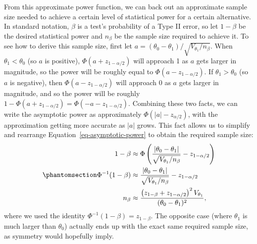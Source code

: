 \documentclass[
  13pt,
  letterpaper,
  DIV=11,
  numbers=noendperiod]{scrreprt}
\theoremstyle{plain}
\theoremstyle{plain}
\theoremstyle{definition}
\theoremstyle{definition}
\theoremstyle{remark}
\begin{document}
From this approximate power function, we can back out an approximate
sample size needed to achieve a certain level of statistical power for a
certain alternative. In standard notation, \(\beta\) is a test's
probability of a Type II error, so let \(1-\beta\) be the desired
statistical power and \(n_{\beta}\) be the sample size required to
achieve it. To see how to derive this sample size, first let
\(a=(\theta_0 - \theta_1) / \sqrt{V_{\theta_1}/n_{\beta}}\). When
\(\theta_1 < \theta_0\) (so \(a\) is positive),
\(\Phi(a + z_{1-\alpha/2})\) will approach 1 as \(a\) gets larger in
magnitude, so the power will be roughly equal to
\(\Phi(a - z_{1-\alpha/2})\). If \(\theta_1 > \theta_0\) (so \(a\) is
negative), then \(\Phi(a - z_{1-\alpha/2})\) will approach 0 as \(a\)
gets larger in magnitude, and so the power will be roughly
\(1 - \Phi(a + z_{1-\alpha/2}) = \Phi(-a - z_{1-\alpha/2})\). Combining
these two facts, we can write the asymptotic power as approximately
\(\Phi(|a| - z_{\alpha/2})\), with the approximation getting more
accurate as \(|a|\) grows. This fact allows us to simplify and rearrange
Equation~\ref{eq-asymptotic-power} to obtain the required sample size:
\begin{equation}\protect\phantomsection\label{eq-sizing}{
\begin{aligned}
1 - \beta &\approx \Phi\left( \frac{|\theta_0 - \theta_1|}{\sqrt{V_{\theta_1}/ n_{\beta}}}-z_{1-\alpha/2} \right) \\
\Phi^{-1}(1-\beta) &\approx  \frac{|\theta_0 - \theta_1|}{\sqrt{V_{\theta_1}/ n_{\beta}}}-z_{1-\alpha/2} \\
n_{\beta} &\approx \frac{\left(z_{1-\beta} + z_{1-\alpha/2}\right)^2V_{\theta_1}}{(\theta_0 - \theta_1)^2},
\end{aligned}
}\end{equation} where we used the identity
\(\Phi^{-1}(1-\beta) = z_{1-\beta}\). The opposite case (where
\(\theta_{1}\) is much larger than \(\theta_{0}\)) actually ends up with
the exact same required sample size, as symmetry would hopefully imply.
\end{document}
